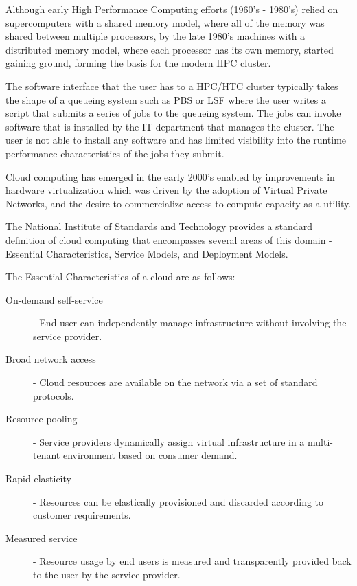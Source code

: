 Although early High Performance Computing efforts (1960's - 1980's) relied on supercomputers with a shared memory model\autocite{russell1978cray}, where all of the memory was shared between multiple processors, by the late 1980's machines with a distributed memory model\autocite{nitzberg1991distributed}, where each processor has its own memory, started gaining ground, forming the basis for the modern HPC cluster.

The software interface that the user has to a HPC/HTC cluster typically takes the shape of a queueing system such as PBS\autocite{henderson1995job} or LSF\autocite{zhou1992lsf}  where the user writes a script that submits a series of jobs to the queueing system. The jobs can invoke software that is installed by the IT department that manages the cluster. The user is not able to install any software and has limited visibility into the runtime performance characteristics of the jobs they submit. 

Cloud computing has emerged in the early 2000's enabled by improvements in hardware virtualization which was driven by the adoption of Virtual Private Networks, and the desire to commercialize access to compute capacity as a utility\autocite{buyya2009cloud}.

The National Institute of Standards and Technology provides a standard definition of cloud computing that encompasses several areas of this domain - Essential Characteristics, Service Models, and Deployment Models\autocite{mell2011nist}.

The Essential Characteristics of a cloud are as follows:

\begin{description}
\item [On-demand self-service] - End-user can independently manage infrastructure without involving the service provider.
\item [Broad network access] - Cloud resources are available on the network via a set of standard protocols.
\item [Resource pooling] - Service providers dynamically assign virtual infrastructure in a multi-tenant environment based on consumer demand.
\item [Rapid elasticity] - Resources can be elastically provisioned and discarded according to customer requirements.
\item [Measured service] - Resource usage by end users is measured and transparently provided back to the user by the service provider.
\end{description}

